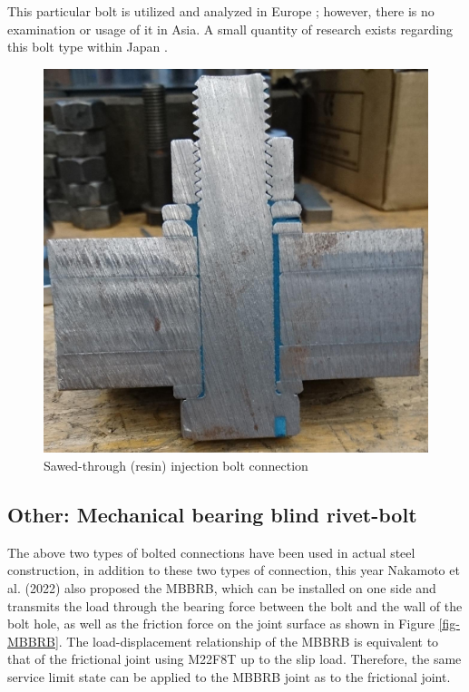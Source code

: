 This particular bolt is utilized and analyzed in Europe \cite{pedrosa2022injbolt-mec,kolstein2017injbolt-mec,pedrosa2020injbolt-fati,pedrosa2021injbolt-fati,gresnigt2000injtbolt-use,ungermann2023injbolt-mec}; however, there is no examination or usage of it in Asia. A small quantity of research exists regarding this bolt type within Japan \cite{fujino2010resbolt,Ryota2018resbolt}.

\begin{figure}
    \centering
    \includegraphics[width=0.75\linewidth]{imgs//ch2/resin-bolt.jpg}
    \caption{Sawed-through (resin) injection bolt connection \cite{Axel2017injbolt}}
    \label{fig-resinbolt}
\end{figure}

\subsection{Other: Mechanical bearing blind rivet-bolt}

The above two types of bolted connections have been used in actual steel construction, in addition to these two types of connection, this year Nakamoto et al. (2022) \cite{Nakamoto2022MBBRB} also proposed the \ac{MBBRB}, which can be installed on one side and transmits the load through the bearing force between the bolt and the wall of the bolt hole, as well as the friction force on the joint surface as shown in Figure \ref{fig-MBBRB}. The load-displacement relationship of the \ac{MBBRB} is equivalent to that of the frictional joint using M22F8T up to the slip load. Therefore, the same service limit state can be applied to the MBBRB joint as to the frictional joint.


